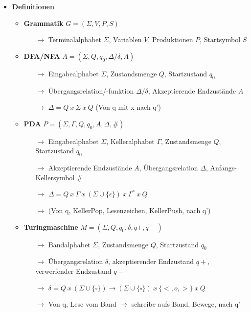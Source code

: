 \documentclass[11pt,a4paper]{article}
\begin{document}
\begin{itemize}
\pagebreak	
	
\item {\large \textbf{Definitionen}}
	\begin{itemize}
	\item \textbf{Grammatik} $G = (\Sigma, V, P, S)$
		\begin{itemize}
		\item[$\rightarrow$] Terminalalphabet $\Sigma$, Variablen $V$, Produktionen $P$, Startsymbol $S$
		\end{itemize}
	\item \textbf{DFA/NFA} $A= (\Sigma, Q, q_0, \Delta/\delta, A)$
		\begin{itemize}
		\item[$\rightarrow$] Eingabealphabet $\Sigma$, Zustandsmenge $Q$, Startzustand $q_0$
		\item[$\rightarrow$] Übergangsrelation/-funktion $\Delta/\delta$, Akzeptierende Endzustände $A$
		\item[$\rightarrow$] $\Delta = Q~x~\Sigma~x~Q$ (Von q mit x nach q')
		\end{itemize}
		
	\item \textbf{PDA} $P = (\Sigma, \Gamma, Q, q_0, A, \Delta, \#)$
		\begin{itemize}
		\item[$\rightarrow$] Eingabealphabet $\Sigma$, Kelleralphabet $\Gamma$, Zustandsmenge $Q$, Startzustand $q_0$
		\item[$\rightarrow$] Akzeptierende Endzustände $A$, Übergangsrelation $\Delta$, Anfangs-Kellersymbol $\#$
		\item[$\rightarrow$] $\Delta = Q~x~\Gamma~x~(\Sigma \cup \{\epsilon\})~x~\Gamma^*~x~Q$
		\item[$\rightarrow$] (Von q, KellerPop, Lesenzeichen, KellerPush, nach q')
		\end{itemize}
		
	\item \textbf{Turingmaschine} $M = (\Sigma, Q, q_0, \delta, q+, q-)$
		\begin{itemize}
		\item[$\rightarrow$] Bandalphabet $\Sigma$, Zustandsmenge $Q$, Startzustand $q_0$
		\item[$\rightarrow$] Übergangsrelation $\delta$, akzeptierender Endzustand $q+$, verwerfender Endzustand $q-$
		\item[$\rightarrow$] $\delta = Q~x~(\Sigma \cup \{\square\}) \rightarrow (\Sigma \cup \{\square\})~x~\{<,o,>\}~x~Q$
		\item[$\rightarrow$] Von q, Lese vom Band $\rightarrow$ schreibe aufs Band, Bewege, nach q'
		\end{itemize}
	

\end{itemize}
\end{itemize}
\end{document}
